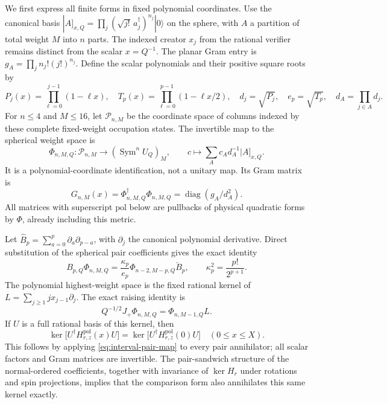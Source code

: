 \documentclass[11pt]{article}
\newcommand{\Sym}{\operatorname{Sym}}
\begin{document}
We first express all finite forms in fixed polynomial coordinates. Use
the canonical basis $|A]_{x,Q}=\prod_j(\sqrt{j!}\,a_j^\dagger)^{n_j}|0\rangle$
on the sphere, with $A$ a partition of total weight $M$ into $n$ parts.
The indexed creator $x_j$ from the rational verifier remains distinct from
the scalar $x=Q^{-1}$. The planar Gram entry is
$g_A=\prod_jn_j!(j!)^{n_j}$. Define the scalar polynomials and their
positive square roots by
\begin{equation}\label{eq:interval-scalar-products}
 P_j(x)=\prod_{\ell=0}^{j-1}(1-\ell x),\quad
 T_p(x)=\prod_{\ell=0}^{p-1}(1-\ell x/2),\quad
 d_j=\sqrt{P_j},\quad e_p=\sqrt{T_p},\quad
 d_A=\prod_{j\in A}d_j.
\end{equation}
For $n\le4$ and $M\le16$, let $\mathcal P_{n,M}$ be the coordinate
space of columns indexed by these complete fixed-weight occupation
states. The invertible map to the spherical weight space is
\begin{equation}\label{eq:interval-polynomial-map}
 \Phi_{n,M,Q}:\mathcal P_{n,M}\longrightarrow
       (\Sym^nU_Q)_M,
 \qquad c\longmapsto\sum_Ac_A d_A^{-1}|A]_{x,Q}.
\end{equation}
It is a polynomial-coordinate identification, not a unitary map. Its
Gram matrix is
\begin{equation}\label{eq:interval-metric}
 G_{n,M}(x)=\Phi_{n,M,Q}^\dagger\Phi_{n,M,Q}
          =\operatorname{diag}(g_A/d_A^2).
\end{equation}
All matrices with superscript $\mathrm{pol}$ below are pullbacks of
physical quadratic forms by $\Phi$, already including this metric.

Let $\widehat B_p=\sum_{a=0}^p\partial_a\partial_{p-a}$, with
$\partial_j$ the canonical polynomial derivative. Direct substitution
of the spherical pair coefficients gives the exact identity
\begin{equation}\label{eq:interval-pair-map}
 B_{p,Q}\Phi_{n,M,Q}
 =\frac{\kappa_p}{e_p}\Phi_{n-2,M-p,Q}\widehat B_p,
 \qquad \kappa_p^2=\frac{p!}{2^{p+1}}.
\end{equation}
The polynomial highest-weight space is the fixed rational kernel of
$L=\sum_{j\ge1}j x_{j-1}\partial_j$. The exact raising identity is
\begin{equation}
 Q^{-1/2}J_+\Phi_{n,M,Q}=\Phi_{n,M-1,Q}L.
\end{equation}
If $U$ is a full rational basis of this kernel, then
\begin{equation}\label{eq:interval-common-kernel}
 \ker\big[U^\dagger H^{\mathrm{pol}}_{r,z}(x)U\big]
 =\ker\big[U^\dagger H^{\mathrm{pol}}_{r,z}(0)U\big]
 \quad (0\le x\le X).
\end{equation}
This follows by applying \eqref{eq:interval-pair-map} to every pair
annihilator; all scalar factors and Gram matrices are invertible.
The pair-sandwich structure of the normal-ordered coefficients, together
with invariance of $\ker H_r$ under rotations and spin projections,
implies that the comparison form also annihilates this same kernel exactly.
\end{document}
